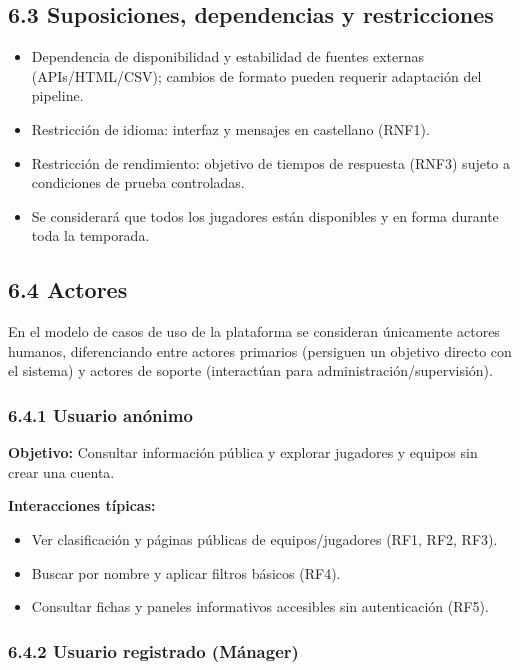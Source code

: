 \subsection{6.3 Suposiciones, dependencias y restricciones}

\begin{itemize}
  \item Dependencia de disponibilidad y estabilidad de fuentes externas (APIs/HTML/CSV); cambios de 
  formato pueden requerir adaptación del pipeline.
  \item Restricción de idioma: interfaz y mensajes en castellano (RNF1).
  \item Restricción de rendimiento: objetivo de tiempos de respuesta (RNF3) sujeto a condiciones de 
  prueba controladas.
  \item Se considerará que todos los jugadores están disponibles y en forma durante toda la temporada.
\end{itemize}

\subsection{6.4 Actores}

En el modelo de casos de uso de la plataforma se consideran únicamente actores humanos, diferenciando 
entre actores primarios (persiguen un objetivo directo con el sistema) y actores de soporte (interactúan 
para administración/supervisión).

\subsubsection{6.4.1 Usuario anónimo}

\textbf{Objetivo:} Consultar información pública y explorar jugadores y equipos sin crear una cuenta.

\textbf{Interacciones típicas:}
\begin{itemize}
  \item Ver clasificación y páginas públicas de equipos/jugadores (RF1, RF2, RF3).
  \item Buscar por nombre y aplicar filtros básicos (RF4).
  \item Consultar fichas y paneles informativos accesibles sin autenticación (RF5).
\end{itemize}

\subsubsection{6.4.2 Usuario registrado (Mánager)}

